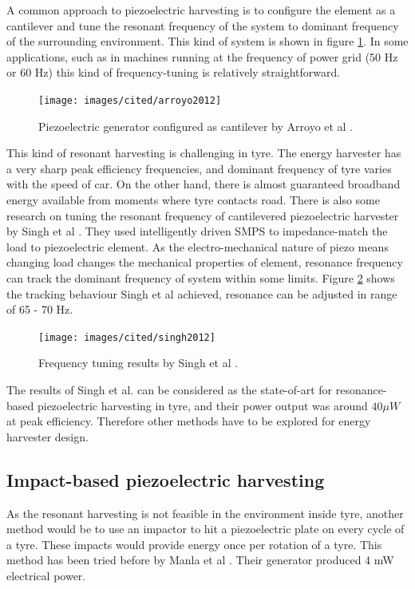A common approach to piezoelectric harvesting is to configure the element as a cantilever and tune the resonant frequency of the system to dominant frequency of the surrounding environment. This kind of system is shown in figure \ref{fiq:resonant_piezo}. In some applications, such as in machines running at the frequency of power grid (50 Hz or 60 Hz) this kind of frequency-tuning is relatively straightforward.

\begin{figure}[htb]
  \begin{center}
  \texttt{[image: images/cited/arroyo2012]}
  \end{center}
  \caption{Piezoelectric generator configured as cantilever by Arroyo et al \cite{Arroyo2012}.}
  \label{fiq:resonant_piezo}
\end{figure}

This kind of resonant harvesting is challenging in tyre. The energy harvester has a very sharp peak efficiency frequencies, and dominant frequency of tyre varies with the speed of car. On the other hand, there is almost guaranteed broadband energy available from moments where tyre contacts road. There is also some research on tuning the resonant frequency of cantilevered piezoelectric harvester by Singh et al \cite{Singh2012}. They used intelligently driven SMPS to impedance-match the load to piezoelectric element. As the electro-mechanical nature of piezo means changing load changes the mechanical properties of element, resonance frequency can track the dominant frequency of system within some limits. Figure \ref{fiq:tracking_piezo} shows the tracking behaviour Singh et al achieved, resonance can be adjusted in range of 65 - 70 Hz.

\begin{figure}[htb]
  \begin{center}
  \texttt{[image: images/cited/singh2012]}
  \end{center}
  \caption{Frequency tuning results by Singh et al \cite{Singh2012}.}
  \label{fiq:tracking_piezo}
\end{figure}

The results of Singh et al. can be considered as the state-of-art for resonance-based piezoelectric harvesting in tyre, and their power output was around $40 \mu W$ at peak efficiency. Therefore other methods have to be explored for energy harvester design.

\subsection{Impact-based piezoelectric harvesting}
As the resonant harvesting is not feasible in the environment inside tyre, another method would be to use an impactor to hit a piezoelectric plate on every cycle of a tyre. These impacts would provide energy once per rotation of a tyre. This method has been tried before by Manla et al \cite{Manla2009}. Their generator produced 4 mW electrical power.

